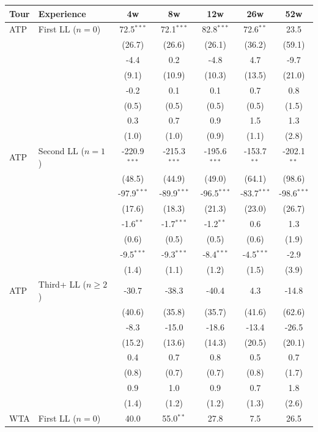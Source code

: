 \begin{tabular}{l l*{5}{c}}
\toprule
Tour & Experience & 4w & 8w & 12w & 26w & 52w \\
\midrule
ATP & First LL ($n=0$) & 72.5$^{***}$ & 72.1$^{***}$ & 82.8$^{***}$ & 72.6$^{**}$ & 23.5 \\
  &  & (26.7) & (26.6) & (26.1) & (36.2) & (59.1) \\
  &  & -4.4 & 0.2 & -4.8 & 4.7 & -9.7 \\
  &  & (9.1) & (10.9) & (10.3) & (13.5) & (21.0) \\
  &  & -0.2 & 0.1 & 0.1 & 0.7 & 0.8 \\
  &  & (0.5) & (0.5) & (0.5) & (0.5) & (1.5) \\
  &  & 0.3 & 0.7 & 0.9 & 1.5 & 1.3 \\
  &  & (1.0) & (1.0) & (0.9) & (1.1) & (2.8) \\
[0.3em]
ATP & Second LL ($n=1$) & -220.9$^{***}$ & -215.3$^{***}$ & -195.6$^{***}$ & -153.7$^{**}$ & -202.1$^{**}$ \\
  &  & (48.5) & (44.9) & (49.0) & (64.1) & (98.6) \\
  &  & -97.9$^{***}$ & -89.9$^{***}$ & -96.5$^{***}$ & -83.7$^{***}$ & -98.6$^{***}$ \\
  &  & (17.6) & (18.3) & (21.3) & (23.0) & (26.7) \\
  &  & -1.6$^{**}$ & -1.7$^{***}$ & -1.2$^{**}$ & 0.6 & 1.3 \\
  &  & (0.6) & (0.5) & (0.5) & (0.6) & (1.9) \\
  &  & -9.5$^{***}$ & -9.3$^{***}$ & -8.4$^{***}$ & -4.5$^{***}$ & -2.9 \\
  &  & (1.4) & (1.1) & (1.2) & (1.5) & (3.9) \\
[0.3em]
ATP & Third+ LL ($n \geq 2$) & -30.7 & -38.3 & -40.4 & 4.3 & -14.8 \\
  &  & (40.6) & (35.8) & (35.7) & (41.6) & (62.6) \\
  &  & -8.3 & -15.0 & -18.6 & -13.4 & -26.5 \\
  &  & (15.2) & (13.6) & (14.3) & (20.5) & (20.1) \\
  &  & 0.4 & 0.7 & 0.8 & 0.5 & 0.7 \\
  &  & (0.8) & (0.7) & (0.7) & (0.8) & (1.7) \\
  &  & 0.9 & 1.0 & 0.9 & 0.7 & 1.8 \\
  &  & (1.4) & (1.2) & (1.2) & (1.3) & (2.6) \\
[0.3em]
\midrule
WTA & First LL ($n=0$) & 40.0 & 55.0$^{**}$ & 27.8 & 7.5 & 26.5 \\

\end{tabular}
